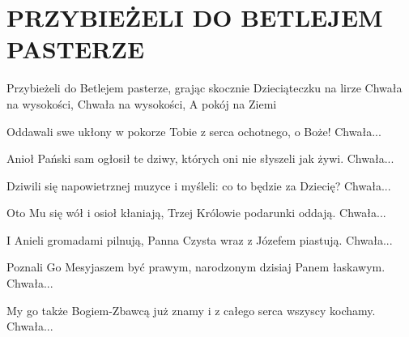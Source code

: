 \documentclass[../../../songbook.tex]{subfiles}
\begin{document}
\TabPositions{8cm} %
\section*{PRZYBIEŻELI DO BETLEJEM PASTERZE}
{}
\vspace{0.5cm}
Przybieżeli do Betlejem pasterze,			 \newline
grając skocznie Dzieciąteczku na lirze		 \newline
\-\hspace{1cm} Chwała na wysokości,			 \newline
\-\hspace{1cm} Chwała na wysokości,			 \newline
\-\hspace{1cm} A pokój na Ziemi				 \newline

Oddawali swe ukłony w pokorze \newline
Tobie z serca ochotnego, o Boże! \newline
\-\hspace{1cm} Chwała... \newline

Anioł Pański sam ogłosił te dziwy, \newline
których oni nie słyszeli jak żywi. \newline
\-\hspace{1cm} Chwała... \newline

Dziwili się napowietrznej muzyce \newline
i myśleli: co to będzie za Dziecię? \newline
\-\hspace{1cm} Chwała... \newline

Oto Mu się wół i osioł kłaniają, \newline
Trzej Królowie podarunki oddają. \newline
\-\hspace{1cm} Chwała... \newline

I Anieli gromadami pilnują, \newline
Panna Czysta wraz z Józefem piastują. \newline
\-\hspace{1cm} Chwała... \newline

Poznali Go Mesyjaszem być prawym, \newline
narodzonym dzisiaj Panem łaskawym. \newline
\-\hspace{1cm} Chwała... \newline

My go także Bogiem-Zbawcą już znamy \newline
i z całego serca wszyscy kochamy. \newline
\-\hspace{1cm} Chwała...
\end{document}
